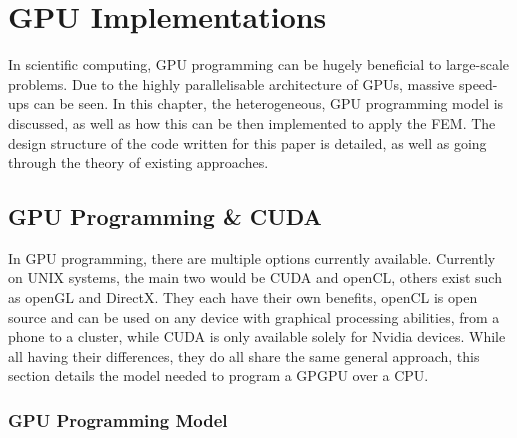 \clearpage
\chapter{GPU Implementations}

In scientific computing, GPU programming can be hugely beneficial to large-scale problems. Due to the highly parallelisable architecture of GPUs, massive speed-ups can be seen. In this chapter, the heterogeneous, GPU programming model is discussed, as well as how this can be then implemented to apply the FEM. The design structure of the code written for this paper is detailed, as well as going through the theory of existing approaches.

\section{GPU Programming \& CUDA}

In GPU programming, there are multiple options currently available. Currently on UNIX systems, the main two would be CUDA and openCL, others exist such as openGL and DirectX. They each have their own benefits, openCL is open source and can be used on any device with graphical processing abilities, from a phone to a cluster, while CUDA is only available solely for Nvidia devices. While all having their differences, they do all share the same general approach, this section details the model needed to program a GPGPU over a CPU.

\subsection{GPU Programming Model}

